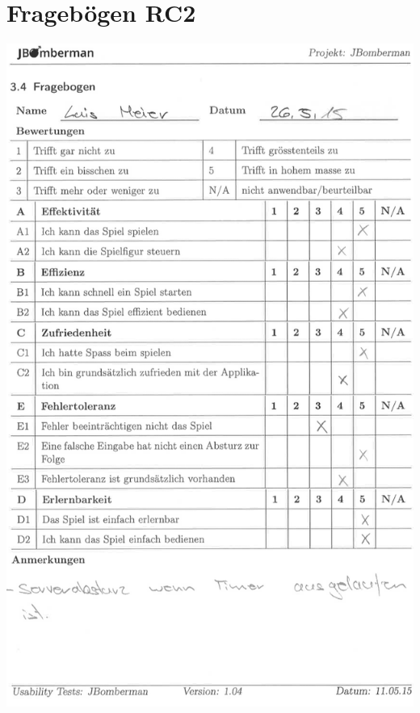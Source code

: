 \documentclass[11pt]{scrartcl}
\begin{document}
\section{Fragebögen RC2}
\includegraphics[scale=0.85]{Luis_RC2}
\newpage
\end{document}
